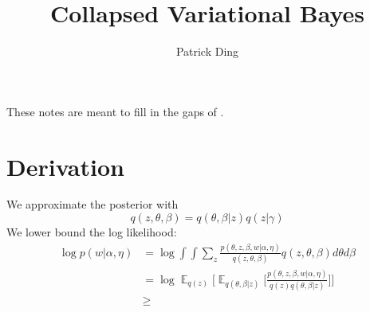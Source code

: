 \documentclass{article}
\DeclareMathOperator{\E}{\mathbb{E}}
\begin{document}
\title{Collapsed Variational Bayes}
\author{Patrick Ding}
\maketitle
\thispagestyle{empty}

These notes are meant to fill in the gaps of \cite{Teh:2007}.

\section{Derivation}

We approximate the posterior with
\begin{equation}
q(z, \theta, \beta) = q(\theta, \beta|z)q(z|\gamma)
\end{equation}
%
We lower bound the log likelihood:
%
\begin{align}
\log p(w|\alpha, \eta) &= \log \int \int \sum_z \frac{p(\theta, z, \beta, w |\alpha, \eta)}{q(z, \theta, \beta)} q(z, \theta, \beta) d\theta d\beta
\\
&=  \log \E_{q(z)} \bigg[ \E_{q(\theta, \beta| z)} \bigg[\frac{p(\theta, z, \beta, w|\alpha, \eta)}{q(z)q(\theta, \beta|z)}\bigg]\bigg]
\\
& \ge 
\end{align}



\end{document}
